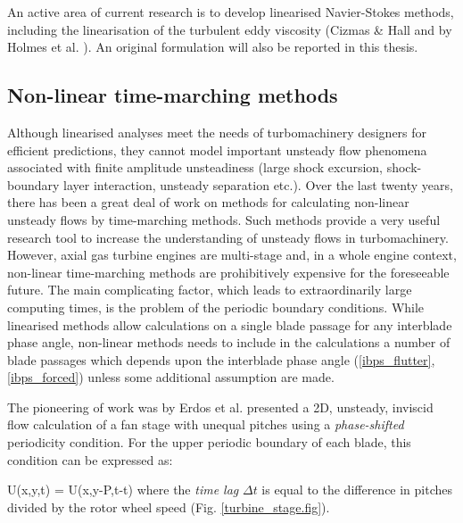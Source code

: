  An active area of current research is to develop linearised
 Navier-Stokes methods, including the linearisation
 of the turbulent eddy viscosity
 (Cizmas \& Hall  and by Holmes et al.
 ).
 An original formulation will also be reported in this thesis.
%
%
\subsection{Non-linear time-marching methods}
\label{nonlinear_prediction_methods.sec}
%
 Although linearised analyses meet the needs of turbomachinery designers
 for efficient predictions, they cannot model
 important unsteady flow phenomena associated with finite amplitude unsteadiness
 (large shock excursion, shock-boundary layer interaction, unsteady separation etc.).
 Over the last twenty years, there has been a great deal of work on methods
 for calculating non-linear unsteady flows by time-marching methods.
 Such methods provide a very useful research tool to increase the understanding
 of unsteady flows in turbomachinery.
 However, axial gas turbine engines are multi-stage and, in a whole engine context,
 non-linear time-marching methods are prohibitively expensive for the
 foreseeable future.
 The main complicating factor, which leads to extraordinarily large computing times,
 is the problem of the periodic boundary conditions.
 While linearised methods allow calculations on a single blade passage
 for any interblade phase angle, non-linear methods needs to include in the calculations
 a number of blade passages which depends upon the interblade phase angle
 (\ref{ibps_flutter},\ref{ibps_forced})
 unless some additional assumption are made.

 The pioneering of work was by Erdos et al. \citeyear{Erdos:1} presented
 a 2D, unsteady, inviscid flow calculation of a fan stage with unequal
 pitches using a {\em phase-shifted} periodicity condition.
 For the upper periodic boundary of each blade, this condition can be expressed as:

%
\beq
  U\left(x,y,t\right) = U\left(x,y-P,t-\Delta t\right)
\eeq
%
 where the {\em time lag} $\Delta t$ is equal to the difference in pitches divided
 by the rotor wheel speed (Fig. \ref{turbine_stage.fig}).

